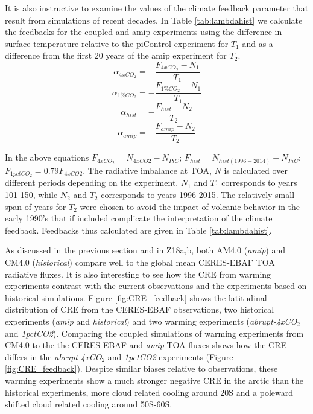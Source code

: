 \documentclass[draft]{agujournal2019}
\begin{document}
It is also instructive to examine the values of the climate feedback parameter that result from simulations of 
recent decades.  In Table \ref{tab:lambdahist} we calculate the feedbacks for the coupled and amip experiments 
using   the difference in surface temperature  
relative to the piControl experiment for $T_1$ and as a difference from the first 20 years of the amip experiment for $T_2$.
\begin{equation}
  \alpha_{4xCO_2}=-\frac{F_{4xCO_2}-N_1}{T_1}
\end{equation}
\begin{equation}
  \alpha_{1\%CO_2}=-\frac{F_{1\%CO_2}-N_1}{T_1}
\end{equation}
\begin{equation}
  \alpha_{hist}=-\frac{F_{hist}-N_2}{T_2}
\end{equation}
\begin{equation}
  \alpha_{amip}=-\frac{F_{amip}-N_2}{T_2}
\end{equation}

In the above equations $F_{4xCO_2}=N_{4xCO2}-N_{PiC}$; $F_{hist}=N_{hist(1996-2014)}-N_{PiC}$; 
$F_{1pctCO_2}=0.79F_{4xCO2}$.  The radiative imbalance at TOA, $N$ is calculated over different periods depending on the experiment.  
$N_1$ and $T_1$ corresponds to years 101-150, while $N_2$ and $T_2$ corresponds to years 1996-2015.  
The relatively small span of years for $T_2$ were chosen to avoid the impact of volcanic behavior in the early 1990's that if included
complicate the interpretation of the climate feedback.  Feedbacks thus calculated are given in Table \ref{tab:lambdahist}.  


As discussed in the previous section and in Z18a,b, both AM4.0 (\textit{amip}) and 
CM4.0 (\textit{historical}) compare well to the global mean CERES-EBAF TOA radiative fluxes.  
It is also interesting to see how the CRE from warming experiments contrast with the current observations
and the experiments based on historical simulations. 
Figure \ref{fig:CRE_feedback} shows the latitudinal distribution of CRE from the CERES-EBAF
observations, two historical experiments (\textit{amip} and \textit{historical}) and two warming 
experiments (\textit{abrupt-4xCO$_2$} and \textit{1pctCO2}).    
Comparing the coupled simulations of warming experiments from CM4.0 to the the CERES-EBAF 
and \textit{amip} TOA fluxes shows how the CRE differs in the \textit{abrupt-4xCO$_2$} and 
\textit{1pctCO2} experiments (Figure \ref{fig:CRE_feedback}).
Despite similar biases relative to observations, these warming experiments show a much
stronger negative CRE in the arctic than the historical experiments, more cloud related 
cooling around 20S and a poleward shifted cloud related cooling around 50S-60S. 
\end{document}
